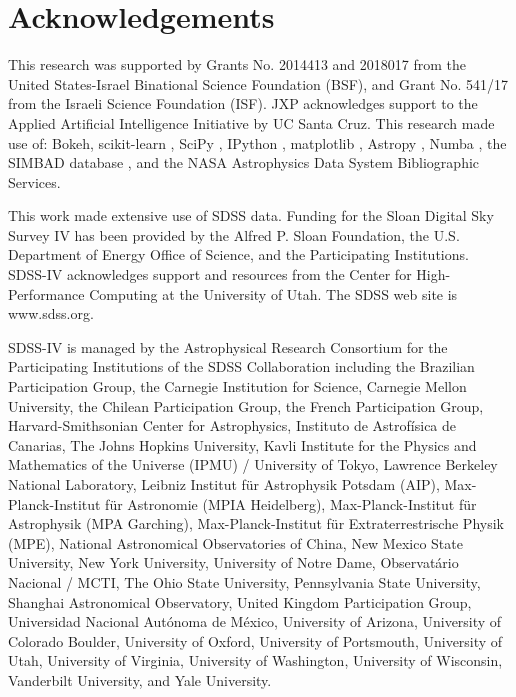 \documentclass[fleqn,usenatbib]{mnras}
\begin{document}
{\section*{Acknowledgements}
This research was supported by Grants No. 2014413 and 2018017 from the United States-Israel Binational Science Foundation (BSF), and Grant No. 541/17 from the Israeli Science Foundation (ISF). 
JXP acknowledges support to the Applied Artificial Intelligence Initiative by UC Santa Cruz.
This research made use of:
{\selectfont Bokeh},  {\selectfont  scikit-learn} \citep[][]{pedregosa11}, {\selectfont  SciPy} \citep[including {\selectfont  pandas} and {\selectfont NumPy, }][]{scipy01},  {\selectfont IPython} \citep[][]{perez07}, {\selectfont matplotlib} \citep[][]{hunter07}, {\selectfont Astropy} \citep[][]{astropy-collaboration13}, {\selectfont Numba} \citep{lam15},  the SIMBAD database \citep[][]{wenger00}, and the NASA Astrophysics Data System Bibliographic Services.

This work made extensive use of SDSS data. Funding for the Sloan Digital Sky Survey IV has been provided by the Alfred P. Sloan Foundation, the U.S. Department of Energy Office of Science, and the Participating Institutions. SDSS-IV acknowledges
support and resources from the Center for High-Performance Computing at
the University of Utah. The SDSS web site is www.sdss.org.

SDSS-IV is managed by the Astrophysical Research Consortium for the 
Participating Institutions of the SDSS Collaboration including the 
Brazilian Participation Group, the Carnegie Institution for Science, 
Carnegie Mellon University, the Chilean Participation Group, the French Participation Group, Harvard-Smithsonian Center for Astrophysics, 
Instituto de Astrof\'isica de Canarias, The Johns Hopkins University, 
Kavli Institute for the Physics and Mathematics of the Universe (IPMU) / 
University of Tokyo, Lawrence Berkeley National Laboratory, 
Leibniz Institut f\"ur Astrophysik Potsdam (AIP),  
Max-Planck-Institut f\"ur Astronomie (MPIA Heidelberg), 
Max-Planck-Institut f\"ur Astrophysik (MPA Garching), 
Max-Planck-Institut f\"ur Extraterrestrische Physik (MPE), 
National Astronomical Observatories of China, New Mexico State University, 
New York University, University of Notre Dame, 
Observat\'ario Nacional / MCTI, The Ohio State University, 
Pennsylvania State University, Shanghai Astronomical Observatory, 
United Kingdom Participation Group,
Universidad Nacional Aut\'onoma de M\'exico, University of Arizona, 
University of Colorado Boulder, University of Oxford, University of Portsmouth, 
University of Utah, University of Virginia, University of Washington, University of Wisconsin, 
Vanderbilt University, and Yale University.



}
\end{document}
